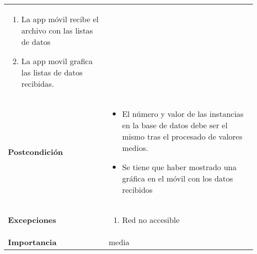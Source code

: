 \begin{longtable}{ p{} p{} }
\begin{enumerate}
        \item La app móvil recibe el archivo con las listas de datos
        \item La app movil grafica las listas de datos recibidas.
    \end{enumerate}\\
    \textbf{Postcondición}        &
    \begin{itemize}
            \item El número y valor de las instancias en la base de datos debe ser el mismo tras el procesado de valores medios.
            \item Se tiene que haber mostrado una gráfica en el móvil con los datos recibidos
    \end{itemize}\\
    \textbf{Excepciones}          & 
        \begin{enumerate}
        \item Red no accesible
        \end{enumerate} \\
    \textbf{Importancia}          & media \\
    \hline
\end{longtable}